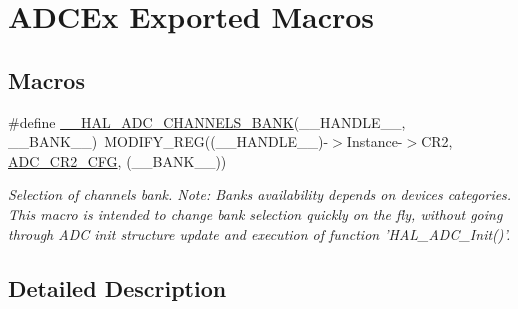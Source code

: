 \hypertarget{group___a_d_c_ex___exported___macros}{\section{A\-D\-C\-Ex Exported Macros}
\label{group___a_d_c_ex___exported___macros}
}
\subsection*{Macros}
\begin{DoxyCompactItemize}
\item 
\#define \hyperlink{group___a_d_c_ex___exported___macros_gaefce3b3493d4fc37fc478adf542ee064}{\-\_\-\-\_\-\-H\-A\-L\-\_\-\-A\-D\-C\-\_\-\-C\-H\-A\-N\-N\-E\-L\-S\-\_\-\-B\-A\-N\-K}(\-\_\-\-\_\-\-H\-A\-N\-D\-L\-E\-\_\-\-\_\-, \-\_\-\-\_\-\-B\-A\-N\-K\-\_\-\-\_\-)~M\-O\-D\-I\-F\-Y\-\_\-\-R\-E\-G((\-\_\-\-\_\-\-H\-A\-N\-D\-L\-E\-\_\-\-\_\-)-\/$>$Instance-\/$>$C\-R2, \hyperlink{group___peripheral___registers___bits___definition_ga5b8796715fcbed90834aa3d1cc91326a}{A\-D\-C\-\_\-\-C\-R2\-\_\-\-C\-F\-G}, (\-\_\-\-\_\-\-B\-A\-N\-K\-\_\-\-\_\-))
\begin{DoxyCompactList}\small\item\em Selection of channels bank. Note\-: Banks availability depends on devices categories. This macro is intended to change bank selection quickly on the fly, without going through A\-D\-C init structure update and execution of function 'H\-A\-L\-\_\-\-A\-D\-C\-\_\-\-Init()'. \end{DoxyCompactList}\end{DoxyCompactItemize}


\subsection{Detailed Description}


